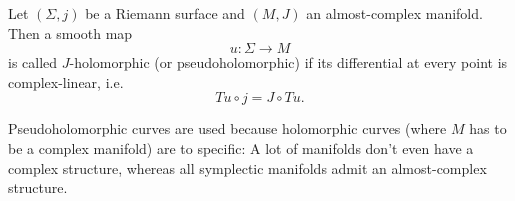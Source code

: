 \begin{definition}
    Let $(\Sigma, j)$ be a Riemann surface and $(M, J)$ an almost-complex manifold. Then a smooth map
    \[
        u \colon \Sigma \to M
    \]
    is called $J$-holomorphic (or pseudoholomorphic) if its differential at every point is complex-linear, i.e.
    \[
        Tu \circ j = J \circ Tu.
    \]
\end{definition}

Pseudoholomorphic curves are used because holomorphic curves (where $M$ has to be a complex manifold) are to specific: 
A lot of manifolds don't even have a complex structure, whereas all symplectic manifolds admit an almost-complex structure.

%

